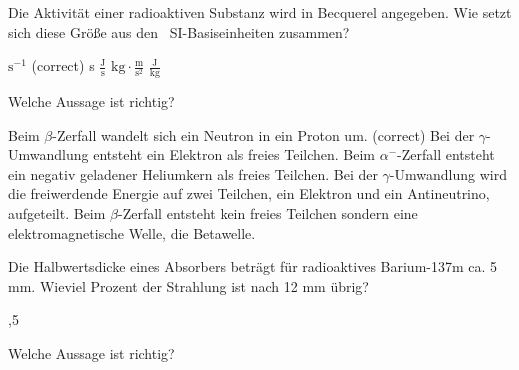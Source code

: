 \documentclass[11pt]{exam}
\begin{document}
\setlength{\voffset}{-0.5in}
\setlength{\headsep}{5pt}

\hspace{2mm}
 \hspace{5mm}
\vspace{4mm}

\begin{questions}

\question Die Aktivität einer radioaktiven Substanz wird in Becquerel angegeben. Wie setzt sich diese Größe aus den  SI-Basiseinheiten zusammen?

\begin{choices}
	\choice \( \text{s}^{-1} \) (correct)
	\choice s
	\choice \( \frac{\text{J}}{\text{s}} \)
	\choice \( \text{kg}\cdot\frac{\text{m}}{\text{s}^2} \)
	\choice \( \frac{\text{J}}{\text{kg}} \)
\end{choices}

\vspace{3mm}\question Welche Aussage ist richtig?

\begin{choices}
	\choice Beim \( \beta \)-Zerfall wandelt sich ein Neutron in ein Proton um. (correct)
	\choice Bei der \( \gamma \)-Umwandlung entsteht ein Elektron als freies Teilchen.
	\choice Beim \( \alpha^- \)-Zerfall entsteht ein negativ geladener Heliumkern als freies Teilchen.
	\choice Bei der \( \gamma \)-Umwandlung wird die freiwerdende Energie auf zwei Teilchen, ein Elektron und ein Antineutrino, aufgeteilt.
	\choice Beim \( \beta \)-Zerfall entsteht kein freies Teilchen sondern eine elektromagnetische Welle, die Betawelle.
\end{choices}

\vspace{3mm}\question Die Halbwertsdicke eines Absorbers beträgt für radioaktives Barium-137m ca. 5 mm. Wieviel Prozent der Strahlung ist nach 12 mm übrig?

\begin{choices}
	,5 %
\end{choices}

\vspace{3mm}\question Welche Aussage ist richtig?


\end{questions}
\end{document}
